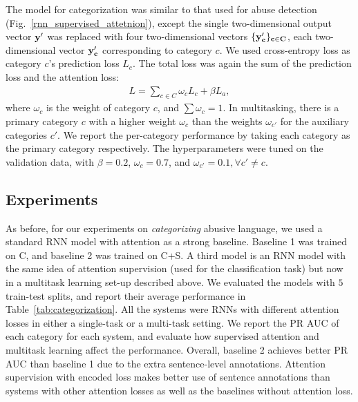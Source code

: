 \documentclass[letterpaper]{article} %
\begin{document}
\vspace{-3.32mm}
The model for categorization was similar to that used for abuse detection (Fig.~\ref{rnn_supervised_attetnion}), except  the single two-dimensional output vector $\bf{y}'$ was  replaced with four two-dimensional vectors $\{\bf{y}_{c}'\}_{c\in C}$,  each two-dimensional vector $\bf{y}_{c}'$ corresponding to category $c$. We used cross-entropy loss as category $c$'s prediction loss $L_{c}$. The total loss  was again the sum of the prediction loss and the attention loss:
\begin{align}
L = \sum_{c\in C}\omega_{c}L_{c} + \beta L_{a},
\end{align}  where $\omega_{c}$ is the weight of category $c$, and $\sum\omega_{c}=1$.
In multitasking, there is a primary category $c$ with a higher weight $\omega_{c}$ than the weights $\omega_{c'}$ for the  auxiliary categories $c'$.
We report the per-category performance by taking each category as the primary category respectively.
The hyperparameters were tuned on the validation data, with $\beta=0.2$, $\omega_{c}=0.7$, and $\omega_{c'}=0.1, \forall c'\not=c$.


\vspace{-3.31mm}
\subsection{Experiments}

As before, for our experiments on \textit{categorizing} abusive language,  we used a standard RNN model with attention as a strong baseline. Baseline 1 was trained on C, and baseline 2 was trained on C+S.
A third model is an RNN model with the same idea of attention supervision (used for the classification task) but now in a multitask learning set-up described above.  We evaluated the models with $5$  train-test splits, and report their average performance in Table~\ref{tab:categorization}. All the systems were RNNs with different attention losses in either a single-task or a multi-task setting. We report the PR AUC of each category for each system, and evaluate how supervised attention and multitask learning affect the  performance. Overall, baseline 2 achieves better PR AUC than baseline 1 due to the extra sentence-level annotations. Attention supervision with encoded loss makes better use of sentence annotations than systems with other attention losses as well as the baselines without attention loss.
\end{document}
